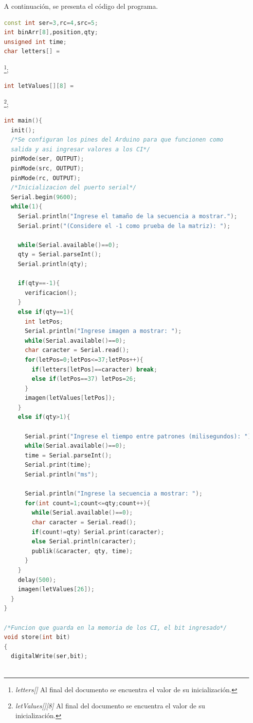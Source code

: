 \documentclass{article}
\begin{document}
A continuación, se presenta el código del programa\cite{arduino}.
\begin{lstlisting}[language=C++, label=codigo_ejemplo]
const int ser=3,rc=4,src=5;
int binArr[8],position,qty;
unsigned int time;
char letters[] = \end{lstlisting}\footnote{\emph{letters[]} Al final del documento se encuentra el valor de su inicialización.};
\begin{lstlisting}[language=C++, label=codigo_ejemplo]
int letValues[][8] = \end{lstlisting}\footnote{\emph{letValues[][8]} Al final del documento se encuentra el valor de su inicialización.};
\begin{lstlisting}[language=C++, label=codigo_ejemplo]
int main(){
  init();
  /*Se configuran los pines del Arduino para que funcionen como
  salida y asi ingresar valores a los CI*/
  pinMode(ser, OUTPUT);
  pinMode(src, OUTPUT);
  pinMode(rc, OUTPUT);
  /*Inicializacion del puerto serial*/
  Serial.begin(9600);
  while(1){
    Serial.println("Ingrese el tamaño de la secuencia a mostrar.");
    Serial.print("(Considere el -1 como prueba de la matriz): ");
  
    while(Serial.available()==0);
    qty = Serial.parseInt();
    Serial.println(qty);
  
    if(qty==-1){
      verificacion();
    }
    else if(qty==1){
      int letPos;
      Serial.println("Ingrese imagen a mostrar: ");
      while(Serial.available()==0);
      char caracter = Serial.read();
      for(letPos=0;letPos<=37;letPos++){
        if(letters[letPos]==caracter) break;
        else if(letPos==37) letPos=26;
      }
      imagen(letValues[letPos]);
    }
    else if(qty>1){
    
      Serial.print("Ingrese el tiempo entre patrones (milisegundos): ");
      while(Serial.available()==0);
      time = Serial.parseInt();
      Serial.print(time);
      Serial.println("ms");
    
      Serial.println("Ingrese la secuencia a mostrar: ");
      for(int count=1;count<=qty;count++){
        while(Serial.available()==0);
        char caracter = Serial.read();
        if(count!=qty) Serial.print(caracter);
        else Serial.println(caracter);
        publik(&caracter, qty, time);
      } 
    }
    delay(500);
    imagen(letValues[26]);
  }
}

/*Funcion que guarda en la memoria de los CI, el bit ingresado*/
void store(int bit)
{
  digitalWrite(ser,bit);
  

\end{lstlisting}
\end{document}
